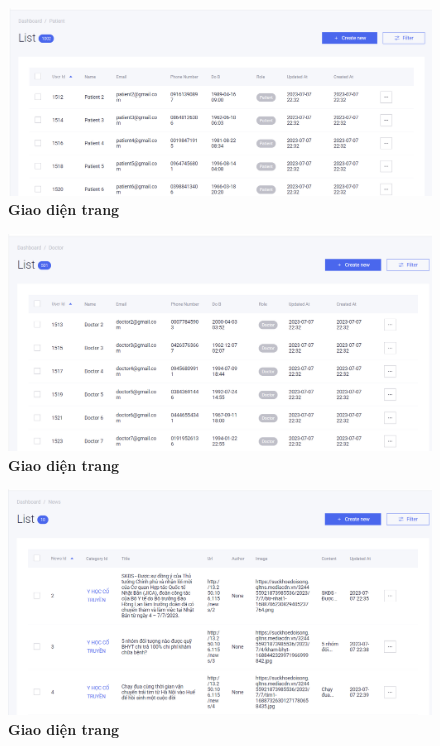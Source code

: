 \begin{figure}[H]
  \centering
  \includegraphics[scale=0.5]{Images/server/webUI/patient_list.PNG}
  \caption[Giao diện trang]{\bfseries \fontsize{12pt}{0pt}\selectfont Giao diện trang}
  \label{demo_} %
\end{figure}


\begin{figure}[H]
  \centering
  \includegraphics[scale=0.5]{Images/server/webUI/list_doctor.PNG}
  \caption[Giao diện trang]{\bfseries \fontsize{12pt}{0pt}\selectfont Giao diện trang}
  \label{demo_} %
\end{figure}


\begin{figure}[H]
  \centering
  \includegraphics[scale=0.5]{Images/server/webUI/news_list.PNG}
  \caption[Giao diện trang]{\bfseries \fontsize{12pt}{0pt}\selectfont Giao diện trang}
  \label{demo_} %
\end{figure}

